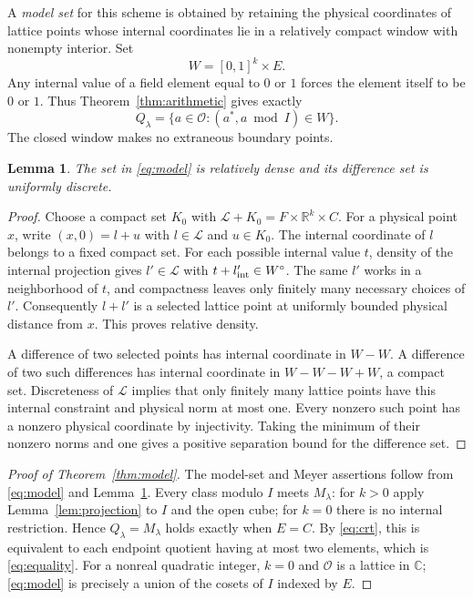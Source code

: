\documentclass[11pt]{article}
\newtheorem{lemma}[theorem]{Lemma}
\theoremstyle{remark}
\newcommand{\R}{\mathbb R}
\newcommand{\C}{\mathbb C}
\newcommand{\Oa}{\mathcal O}
\begin{document}
A \emph{model set} for this scheme is obtained by retaining the physical coordinates of lattice points whose internal coordinates lie in a relatively compact window with nonempty interior. Set
\[
 W=[0,1]^k\times E.
\]
Any internal value of a field element equal to $0$ or $1$ forces the element itself to be $0$ or $1$. Thus Theorem~\ref{thm:arithmetic} gives exactly
\begin{equation}\label{eq:model}
 Q_\lambda=\{a\in\Oa:(a^*,a\bmod I)\in W\}.
\end{equation}
The closed window makes no extraneous boundary points.

\begin{lemma}\label{lem:meyer}
The set in \eqref{eq:model} is relatively dense and its difference set is uniformly discrete.
\end{lemma}
\begin{proof}
Choose a compact set $K_0$ with $\mathcal L+K_0=F\times\R^k\times C$. For a physical point $x$, write $(x,0)=l+u$ with $l\in\mathcal L$ and $u\in K_0$. The internal coordinate of $l$ belongs to a fixed compact set. For each possible internal value $t$, density of the internal projection gives $l'\in\mathcal L$ with $t+l'_{\rm int}\in W^\circ$. The same $l'$ works in a neighborhood of $t$, and compactness leaves only finitely many necessary choices of $l'$. Consequently $l+l'$ is a selected lattice point at uniformly bounded physical distance from $x$. This proves relative density.

A difference of two selected points has internal coordinate in $W-W$. A difference of two such differences has internal coordinate in $W-W-W+W$, a compact set. Discreteness of $\mathcal L$ implies that only finitely many lattice points have this internal constraint and physical norm at most one. Every nonzero such point has a nonzero physical coordinate by injectivity. Taking the minimum of their nonzero norms and one gives a positive separation bound for the difference set.
\end{proof}

\begin{proof}[Proof of Theorem~\ref{thm:model}]
The model-set and Meyer assertions follow from \eqref{eq:model} and Lemma~\ref{lem:meyer}. Every class modulo $I$ meets $M_\lambda$: for $k>0$ apply Lemma~\ref{lem:projection} to $I$ and the open cube; for $k=0$ there is no internal restriction. Hence $Q_\lambda=M_\lambda$ holds exactly when $E=C$. By \eqref{eq:crt}, this is equivalent to each endpoint quotient having at most two elements, which is \eqref{eq:equality}. For a nonreal quadratic integer, $k=0$ and $\Oa$ is a lattice in $\C$; \eqref{eq:model} is precisely a union of the cosets of $I$ indexed by $E$.
\end{proof}
\end{document}

